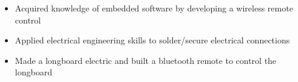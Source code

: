 \documentclass[8pt,a4paper]{altacv}
\begin{document}
\begin{itemize}
\item Acquired knowledge of embedded software by developing a wireless remote control
\item Applied electrical engineering skills to solder/secure electrical connections
\end{itemize}
\divider

\begin{itemize}
\item Made a longboard electric and built a bluetooth remote to control the longboard 
\end{itemize}

\clearpage

\end{document}
